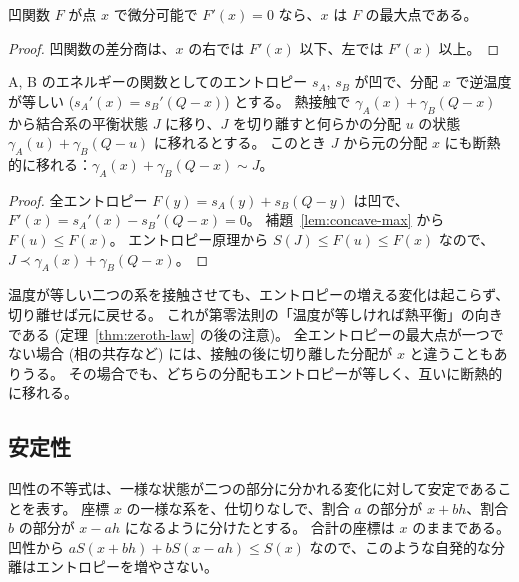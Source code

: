 \begin{lemma}
  \label{lem:concave-max}
  \leanok
  凹関数 $F$ が点 $x$ で微分可能で $F'(x) = 0$ なら、$x$ は $F$ の最大点である。
\end{lemma}

\begin{proof}
  \leanok
  凹関数の差分商は、$x$ の右では $F'(x)$ 以下、左では $F'(x)$ 以上。
\end{proof}

\begin{theorem}[温度が等しければ熱接触は可逆]
  \label{thm:contact-reversible}
  \leanok
  A, B のエネルギーの関数としてのエントロピー $s_A$, $s_B$ が凹で、分配 $x$ で逆温度が等しい ($s_A'(x) = s_B'(Q - x)$) とする。
  熱接触で $\gamma_A(x) + \gamma_B(Q - x)$ から結合系の平衡状態 $J$ に移り、$J$ を切り離すと何らかの分配 $u$ の状態 $\gamma_A(u) + \gamma_B(Q - u)$ に移れるとする。
  このとき $J$ から元の分配 $x$ にも断熱的に移れる：$\gamma_A(x) + \gamma_B(Q - x) \sim J$。
\end{theorem}

\begin{proof}
  \leanok
  全エントロピー $F(y) = s_A(y) + s_B(Q - y)$ は凹で、$F'(x) = s_A'(x) - s_B'(Q - x) = 0$。
  補題~\ref{lem:concave-max} から $F(u) \le F(x)$。
  エントロピー原理から $S(J) \le F(u) \le F(x)$ なので、$J \prec \gamma_A(x) + \gamma_B(Q - x)$。
\end{proof}

温度が等しい二つの系を接触させても、エントロピーの増える変化は起こらず、切り離せば元に戻せる。
これが第零法則の「温度が等しければ熱平衡」の向きである (定理~\ref{thm:zeroth-law} の後の注意)。
全エントロピーの最大点が一つでない場合 (相の共存など) には、接触の後に切り離した分配が $x$ と違うこともありうる。
その場合でも、どちらの分配もエントロピーが等しく、互いに断熱的に移れる。

\subsection{安定性}

凹性の不等式は、一様な状態が二つの部分に分かれる変化に対して安定であることを表す。
座標 $x$ の一様な系を、仕切りなしで、割合 $a$ の部分が $x + b h$、割合 $b$ の部分が $x - a h$ になるように分けたとする。
合計の座標は $x$ のままである。
凹性から $a S(x + bh) + b S(x - ah) \le S(x)$ なので、このような自発的な分離はエントロピーを増やさない。

